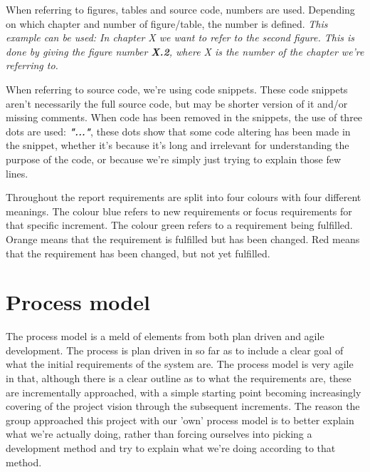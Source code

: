 When referring to figures, tables and source code, numbers are used. Depending on which chapter and number of figure/table, the number is defined. \newline
\textit{This example can be used: In chapter X we want to refer to the second figure. This is done by giving the figure number \textbf{X.2}, where X is the number of the chapter we're referring to.}
\newline


When referring to source code, we're using code snippets. These code snippets aren't necessarily the full source code, but may be shorter version of it and/or missing comments. When code has been removed in the snippets, the use of three dots are used:  \textit\textbf{{"..."}}, these dots show that some code altering has been made in the snippet, whether it's because it's long and irrelevant for understanding the purpose of the code, or because we're simply just trying to explain those few lines. 


Throughout the report requirements are split into four colours with four different meanings. The colour blue refers to new requirements or focus requirements for that specific increment. The colour green refers to a requirement being fulfilled. Orange means that the requirement is fulfilled but has been changed. Red means that the requirement has been changed, but not yet fulfilled. 


\chapter*{Process model}
\label{Process model}
The process model is a meld of elements from both plan driven and agile development. The process is plan driven in so far as to include a clear goal of what the initial requirements of the system are. The process model is very agile in that, although there is a clear outline as to what the requirements are, these are incrementally approached, with a simple starting point becoming increasingly covering of the project vision through the subsequent increments. The reason the group approached this project with our 'own' process model is to better explain what we're actually doing, rather than forcing ourselves into picking a development method and try to explain what we're doing according to that method.



